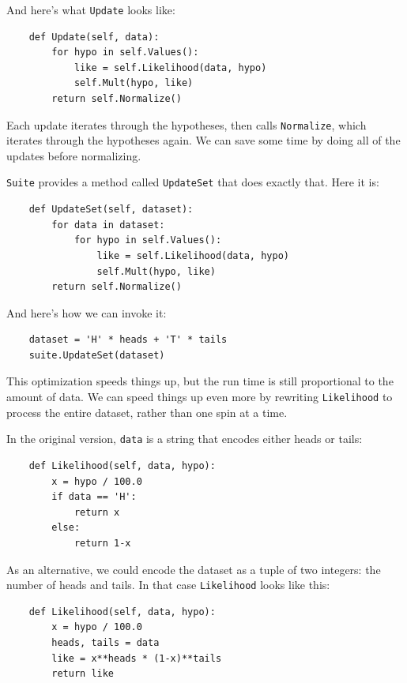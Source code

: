 \documentclass[12pt]{book}
\begin{document}
And here's what \verb"Update" looks like:

\begin{verbatim}
    def Update(self, data):
        for hypo in self.Values():
            like = self.Likelihood(data, hypo)
            self.Mult(hypo, like)
        return self.Normalize()
\end{verbatim}

Each update iterates through the hypotheses, then calls \verb"Normalize",
which iterates through the hypotheses again.  We can save some
time by doing all of the updates before normalizing.

\verb"Suite" provides a method called \verb"UpdateSet" that does
exactly that.  Here it is:

\begin{verbatim}
    def UpdateSet(self, dataset):
        for data in dataset:
            for hypo in self.Values():
                like = self.Likelihood(data, hypo)
                self.Mult(hypo, like)
        return self.Normalize()
\end{verbatim}

And here's how we can invoke it:

\begin{verbatim}
    dataset = 'H' * heads + 'T' * tails
    suite.UpdateSet(dataset)
\end{verbatim}

This optimization speeds things up, but the run time is still
proportional to the amount of data.  We can speed things up
even more by rewriting \verb"Likelihood" to process the entire
dataset, rather than one spin at a time.

In the original version,
\verb"data" is a string that encodes either heads or tails:

\begin{verbatim}
    def Likelihood(self, data, hypo):
        x = hypo / 100.0
        if data == 'H':
            return x
        else:
            return 1-x
\end{verbatim}

As an alternative, we could encode the dataset as a tuple of 
two integers: the number of heads and tails.
In that case \verb"Likelihood" looks like this:

\begin{verbatim}
    def Likelihood(self, data, hypo):
        x = hypo / 100.0
        heads, tails = data
        like = x**heads * (1-x)**tails
        return like
\end{verbatim}
\end{document}
